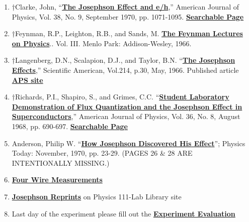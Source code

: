 \documentclass{../lab}
\begin{document}
\begin{enumerate}
    \item †Clarke, John, ``\href{http://physics111.lib.berkeley.edu/Physics111/Reprints/JOS/Clark_Josephson_effect_andeh.pdf}{\textbf{The Josephson Effect and e/h}},'' American Journal of Physics, Vol. 38, No. 9, September 1970, pp. 1071-1095. \href{http://physics111.lib.berkeley.edu/Physics111/Reprints/JOS/03-The\_Josephson\_Effect\_and\_e\_h.pdf}{\textbf{Searchable Page}}

    \item †Feynman, R.P., Leighton, R.B., and Sands, M. \href{http://physics111.lib.berkeley.edu/Physics111/Reprints/JOS/08-Superconductivity.pdf}{\textbf{The Feynman Lectures on Physics}}.. Vol. III. Menlo Park: Addison-Wesley, 1966.

    \item †Langenberg, D.N., Scalapion, D.J., and Taylor, B.N. ``\href{http://physics111.lib.berkeley.edu/Physics111/Reprints/JOS/04-The\_Josephson\_Effects.pdf}{\textbf{The Josephson Effects}},'' Scientific American, Vol.214, p.30, May, 1966. Published article \href{http://prola.aps.org/abstract/PR/v150/i1/p186\_1}{\textbf{APS site}}

    \item †Richards, P.I., Shapiro, S., and Grimes, C.C. ``\href{http://physics111.lib.berkeley.edu/Physics111/Reprints/JOS/01-Student_Laboratory_Demonstration.pdf}{\textbf{Student Laboratory Demonstration of Flux Quantization and the Josephson Effect in Superconductors}},'' American Journal of Physics, Vol. 36, No. 8, August 1968, pp. 690-697. \href{http://physics111.lib.berkeley.edu/Physics111/Reprints/JOS/01-Student\_Laboratory\_Demonstration.pdf}{\textbf{Searchable Page}}

    \item Anderson, Philip W. ``\href{http://physics111.lib.berkeley.edu/Physics111/Reprints/JOS/05-How_Josephson_Discovered_his_Effect.pdf}{\textbf{How Josephson Discovered His Effect}}''; Physics Today: November, 1970, pp. 23-29. (PAGES 26 \& 28 ARE INTENTIONALLY MISSING.)

    \item \href{http://physics111.lib.berkeley.edu/Physics111/Reprints/JOS/10-Four\_Wire\_Measurement.pdf}{\textbf{Four Wire Measurements}}

    \item \href{http://physics111.lib.berkeley.edu/Physics111/Reprints/JOS/JOS\_index.html}{\textbf{Josephson Reprints}} on Physics 111-Lab Library site

    \item Last day of the experiment please fill out the \href{\ExperimentEvaluation}{\textbf{Experiment Evaluation}}

\end{enumerate}
\end{document}
